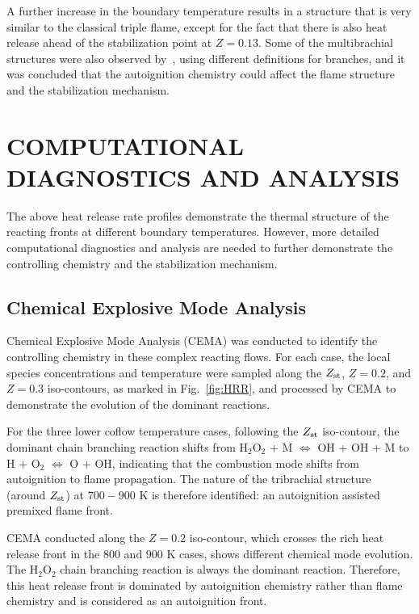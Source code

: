\documentclass[twocolumn,10pt]{hphrc}
\begin{document}
A further increase in the boundary temperature results in a structure that is very similar to the classical triple flame, except for the fact that there is also heat release ahead of the stabilization point at $Z = 0.13$.  Some of the multibrachial structures were also observed by~\cite{krisman14}, using different definitions for branches, and it was concluded that the autoignition chemistry could affect the flame structure and the stabilization mechanism.  


\section*{COMPUTATIONAL DIAGNOSTICS AND ANALYSIS}

The above heat release rate profiles demonstrate the thermal structure of the reacting fronts at different boundary temperatures.  However, more detailed computational diagnostics and analysis are needed to further demonstrate the controlling chemistry and the stabilization mechanism.

\subsection*{Chemical Explosive Mode Analysis}

Chemical Explosive Mode Analysis (CEMA) was conducted to identify the controlling chemistry in these complex reacting flows.  For each case, the local species concentrations and temperature were sampled along the $Z_{\rm st}$, $Z = 0.2$, and $Z = 0.3$ iso-contours, as marked in Fig.~\ref{fig:HRR}, and processed by CEMA to demonstrate the evolution of the dominant reactions.  

For the three lower coflow temperature cases, following the $Z_{\rm st}$ iso-contour, the dominant chain branching reaction shifts from H$_2$O$_2$ + M $\Longleftrightarrow$ OH + OH + M to H + O$_2$ $\Longleftrightarrow$ O + OH, indicating that the combustion mode shifts from autoignition to flame propagation.  The nature of the tribrachial structure (around $Z_{\rm st}$) at $700-900$ K is therefore identified: an autoignition assisted premixed flame front.

CEMA conducted along the $Z = 0.2$ iso-contour, which crosses the rich heat release front in the $800$ and $900$ K cases, shows different chemical mode evolution. The H$_2$O$_2$ chain branching reaction is always the dominant reaction.  Therefore, this heat release front is dominated by autoignition chemistry rather than flame chemistry and is considered as an autoignition front.
\end{document}
